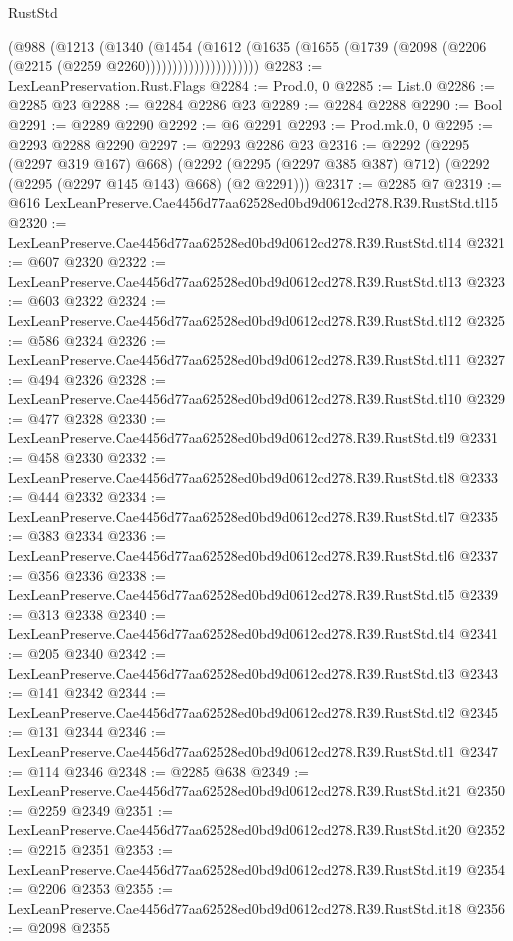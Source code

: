\begin{lexlean}{RustStd}
\begin{coremodule}
                      (@988
                        (@1213
                          (@1340
                            (@1454
                              (@1612
                                (@1635
                                  (@1655
                                    (@1739 (@2098 (@2206 (@2215 (@2259 @2260)))))))))))))))))))))
@2283 := LexLeanPreservation.Rust.Flags
@2284 := Prod.{0, 0}
@2285 := List.{0}
@2286 := @2285 @23
@2288 := @2284 @2286 @23
@2289 := @2284 @2288
@2290 := Bool
@2291 := @2289 @2290
@2292 := @6 @2291
@2293 := Prod.mk.{0, 0}
@2295 := @2293 @2288 @2290
@2297 := @2293 @2286 @23
@2316 := @2292
    (@2295 (@2297 @319 @167) @668)
    (@2292 (@2295 (@2297 @385 @387) @712) (@2292 (@2295 (@2297 @145 @143) @668) (@2 @2291)))
@2317 := @2285 @7
@2319 := @616 LexLeanPreserve.Cae4456d77aa62528ed0bd9d0612cd278.R39.RustStd.tl15
@2320 := LexLeanPreserve.Cae4456d77aa62528ed0bd9d0612cd278.R39.RustStd.tl14
@2321 := @607 @2320
@2322 := LexLeanPreserve.Cae4456d77aa62528ed0bd9d0612cd278.R39.RustStd.tl13
@2323 := @603 @2322
@2324 := LexLeanPreserve.Cae4456d77aa62528ed0bd9d0612cd278.R39.RustStd.tl12
@2325 := @586 @2324
@2326 := LexLeanPreserve.Cae4456d77aa62528ed0bd9d0612cd278.R39.RustStd.tl11
@2327 := @494 @2326
@2328 := LexLeanPreserve.Cae4456d77aa62528ed0bd9d0612cd278.R39.RustStd.tl10
@2329 := @477 @2328
@2330 := LexLeanPreserve.Cae4456d77aa62528ed0bd9d0612cd278.R39.RustStd.tl9
@2331 := @458 @2330
@2332 := LexLeanPreserve.Cae4456d77aa62528ed0bd9d0612cd278.R39.RustStd.tl8
@2333 := @444 @2332
@2334 := LexLeanPreserve.Cae4456d77aa62528ed0bd9d0612cd278.R39.RustStd.tl7
@2335 := @383 @2334
@2336 := LexLeanPreserve.Cae4456d77aa62528ed0bd9d0612cd278.R39.RustStd.tl6
@2337 := @356 @2336
@2338 := LexLeanPreserve.Cae4456d77aa62528ed0bd9d0612cd278.R39.RustStd.tl5
@2339 := @313 @2338
@2340 := LexLeanPreserve.Cae4456d77aa62528ed0bd9d0612cd278.R39.RustStd.tl4
@2341 := @205 @2340
@2342 := LexLeanPreserve.Cae4456d77aa62528ed0bd9d0612cd278.R39.RustStd.tl3
@2343 := @141 @2342
@2344 := LexLeanPreserve.Cae4456d77aa62528ed0bd9d0612cd278.R39.RustStd.tl2
@2345 := @131 @2344
@2346 := LexLeanPreserve.Cae4456d77aa62528ed0bd9d0612cd278.R39.RustStd.tl1
@2347 := @114 @2346
@2348 := @2285 @638
@2349 := LexLeanPreserve.Cae4456d77aa62528ed0bd9d0612cd278.R39.RustStd.it21
@2350 := @2259 @2349
@2351 := LexLeanPreserve.Cae4456d77aa62528ed0bd9d0612cd278.R39.RustStd.it20
@2352 := @2215 @2351
@2353 := LexLeanPreserve.Cae4456d77aa62528ed0bd9d0612cd278.R39.RustStd.it19
@2354 := @2206 @2353
@2355 := LexLeanPreserve.Cae4456d77aa62528ed0bd9d0612cd278.R39.RustStd.it18
@2356 := @2098 @2355

\end{coremodule}
\end{lexlean}
